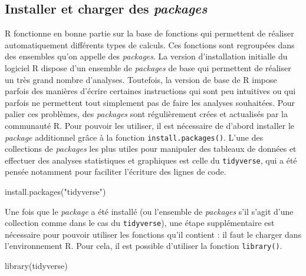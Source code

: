 \documentclass[
]{book}
\newenvironment{Shaded}{\begin{snugshade}}{\end{snugshade}}
\newcommand{\FunctionTok}[1]{\textcolor[rgb]{0.00,0.00,0.00}{#1}}
\newcommand{\NormalTok}[1]{#1}
\newcommand{\StringTok}[1]{\textcolor[rgb]{0.31,0.60,0.02}{#1}}
\begin{document}
\hypertarget{installer-et-charger-des-packages}{%
\subsection{\texorpdfstring{Installer et charger des \emph{packages}}{Installer et charger des packages}}\label{installer-et-charger-des-packages}}

R fonctionne en bonne partie sur la base de fonctions qui permettent de réaliser automatiquement différents types de calculs. Ces fonctions sont regroupées dans des ensembles qu'on appelle des \emph{packages}. La version d'installation initialle du logiciel R dispose d'un ensemble de \emph{packages} de base qui permettent de réaliser un très grand nombre d'analyses. Toutefois, la version de base de R impose parfois des manières d'écrire certaines instructions qui sont peu intuitives ou qui parfois ne permettent tout simplement pas de faire les analyses souhaitées. Pour palier ces problèmes, des \emph{packages} sont régulièrement crées et actualisés par la communauté R. Pour pouvoir les utiliser, il est nécessaire de d'abord installer le \emph{package} additionnel grâce à la fonction \texttt{install.packages()}. L'une des collections de \emph{packages} les plus utiles pour manipuler des tableaux de données et effectuer des analyses statistiques et graphiques est celle du \texttt{tidyverse}, qui a été pensée notamment pour faciliter l'écriture des lignes de code.

\begin{Shaded}
\begin{Highlighting}[]
\FunctionTok{install.packages}\NormalTok{(}\StringTok{"tidyverse"}\NormalTok{)}
\end{Highlighting}
\end{Shaded}

Une fois que le \emph{package} a été installé (ou l'ensemble de \emph{packages} s'il s'agit d'une collection comme dans le cas du \texttt{tidyverse}), une étape supplémentaire est nécessaire pour pouvoir utiliser les fonctions qu'il contient : il faut le charger dans l'environnement R. Pour cela, il est possible d'utiliser la fonction \texttt{library()}.

\begin{Shaded}
\begin{Highlighting}[]
\FunctionTok{library}\NormalTok{(tidyverse)}
\end{Highlighting}
\end{Shaded}
\end{document}
